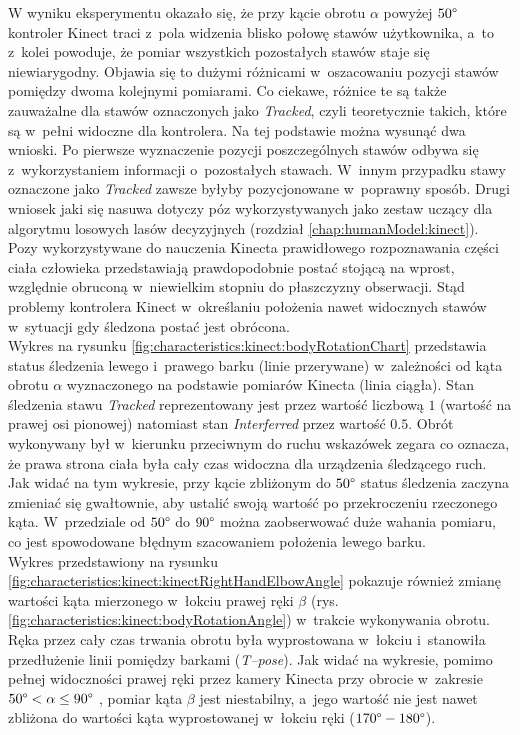 																																					
W wyniku eksperymentu okazało się, że przy kącie obrotu $\alpha$ powyżej $50\degree$ kontroler Kinect traci z~pola widzenia blisko połowę stawów użytkownika, a~to z~kolei powoduje, że pomiar wszystkich pozostałych stawów staje się niewiarygodny. Objawia się to dużymi różnicami w~oszacowaniu pozycji stawów pomiędzy dwoma kolejnymi pomiarami. Co ciekawe, różnice te są także zauważalne dla stawów oznaczonych jako \emph{Tracked}, czyli teoretycznie takich, które są w~pełni widoczne dla kontrolera. Na tej podstawie można wysunąć dwa wnioski. Po pierwsze wyznaczenie pozycji poszczególnych stawów odbywa się z~wykorzystaniem informacji o~pozostałych stawach. W~innym przypadku stawy oznaczone jako \emph{Tracked} zawsze byłyby pozycjonowane w~poprawny sposób. Drugi wniosek jaki się nasuwa dotyczy póz wykorzystywanych jako zestaw uczący dla algorytmu losowych lasów decyzyjnych (rozdział \ref{chap:humanModel:kinect}). Pozy wykorzystywane do nauczenia Kinecta prawidłowego rozpoznawania części ciała człowieka przedstawiają prawdopodobnie postać stojącą na wprost, względnie obruconą w~niewielkim stopniu do płaszczyzny obserwacji. Stąd problemy kontrolera Kinect w~określaniu położenia nawet widocznych stawów w~sytuacji gdy śledzona postać jest obrócona.\\
																																					
Wykres na rysunku \ref{fig:characteristics:kinect:bodyRotationChart} przedstawia status śledzenia lewego i~prawego barku (linie przerywane) w~zależności od kąta obrotu $\alpha$ wyznaczonego na podstawie pomiarów Kinecta (linia ciągła). Stan śledzenia stawu \emph{Tracked} reprezentowany jest przez wartość liczbową $1$ (wartość na prawej osi pionowej) natomiast stan \emph{Interferred} przez wartość $0.5$. Obrót wykonywany był w~kierunku przeciwnym do ruchu wskazówek zegara co oznacza, że prawa strona ciała była cały czas widoczna dla urządzenia śledzącego ruch. Jak widać na tym wykresie, przy kącie zbliżonym do $50\degree$ status śledzenia zaczyna zmieniać się gwałtownie, aby ustalić swoją wartość po przekroczeniu rzeczonego kąta. W~przedziale od $50\degree$ do $90\degree$ można zaobserwować duże wahania pomiaru, co jest spowodowane błędnym szacowaniem położenia lewego barku.\\ 
Wykres przedstawiony na rysunku \ref{fig:characteristics:kinect:kinectRightHandElbowAngle} pokazuje również zmianę wartości kąta mierzonego w~łokciu prawej ręki $\beta$ (rys. \ref{fig:characteristics:kinect:bodyRotationAngle}) w~trakcie wykonywania obrotu. Ręka przez cały czas trwania obrotu była wyprostowana w~łokciu i~stanowiła przedłużenie linii pomiędzy barkami (\emph{T--pose}). Jak widać na wykresie, pomimo pełnej widoczności prawej ręki przez kamery Kinecta przy obrocie w~zakresie  $50\degree < \alpha \le 90\degree$ , pomiar kąta $\beta$ jest niestabilny, a~jego wartość nie jest nawet zbliżona do wartości kąta wyprostowanej w~łokciu ręki ($170\degree-180\degree$). 
																																							
